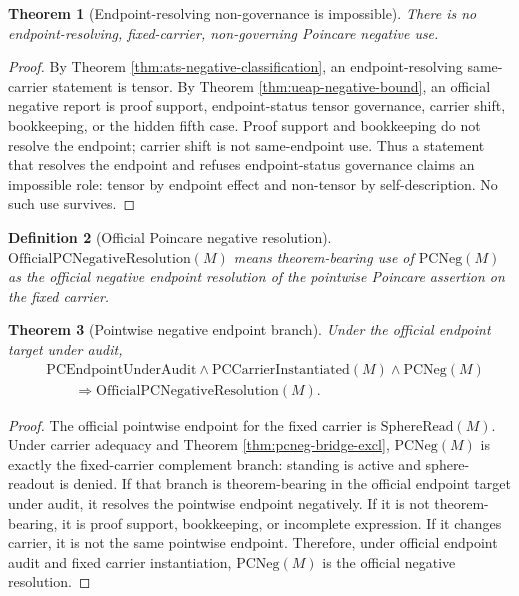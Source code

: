 \documentclass[11pt]{article}
\newtheorem{theorem}{Theorem}[section]
\newtheorem{definition}[theorem]{Definition}
\newcommand{\SphereRead}{\mathrm{SphereRead}}
\newcommand{\PCEndpoint}{\mathrm{PCEndpointUnderAudit}}
\newcommand{\PCCarrierInst}{\mathrm{PCCarrierInstantiated}}
\newcommand{\OfficialPCNegativeResolution}{\mathrm{OfficialPCNegativeResolution}}
\newcommand{\PCNeg}{\mathrm{PCNeg}}
\begin{document}
\begin{theorem}[Endpoint-resolving non-governance is impossible]\label{thm:no-hidden-fifth}
There is no endpoint-resolving, fixed-carrier, non-governing Poincare negative use.
\end{theorem}
\begin{proof}
By Theorem \ref{thm:ats-negative-classification}, an endpoint-resolving same-carrier statement is tensor. By Theorem \ref{thm:ueap-negative-bound}, an official negative report is proof support, endpoint-status tensor governance, carrier shift, bookkeeping, or the hidden fifth case. Proof support and bookkeeping do not resolve the endpoint; carrier shift is not same-endpoint use. Thus a statement that resolves the endpoint and refuses endpoint-status governance claims an impossible role: tensor by endpoint effect and non-tensor by self-description. No such use survives.
\end{proof}

\begin{definition}[Official Poincare negative resolution]
\(\OfficialPCNegativeResolution(M)\) means theorem-bearing use of \(\PCNeg(M)\) as the official negative endpoint resolution of the pointwise Poincare assertion on the fixed carrier.
\end{definition}

\begin{theorem}[Pointwise negative endpoint branch]\label{thm:pcneg-official-negative}
Under the official endpoint target under audit,
\[
\begin{aligned}
&\PCEndpoint\wedge\PCCarrierInst(M)\wedge\PCNeg(M)\\
&\qquad\Rightarrow\OfficialPCNegativeResolution(M).
\end{aligned}
\]
\end{theorem}
\begin{proof}
The official pointwise endpoint for the fixed carrier is \(\SphereRead(M)\). Under carrier adequacy and Theorem \ref{thm:pcneg-bridge-excl}, \(\PCNeg(M)\) is exactly the fixed-carrier complement branch: standing is active and sphere-readout is denied. If that branch is theorem-bearing in the official endpoint target under audit, it resolves the pointwise endpoint negatively. If it is not theorem-bearing, it is proof support, bookkeeping, or incomplete expression. If it changes carrier, it is not the same pointwise endpoint. Therefore, under official endpoint audit and fixed carrier instantiation, \(\PCNeg(M)\) is the official negative resolution.
\end{proof}
\end{document}
